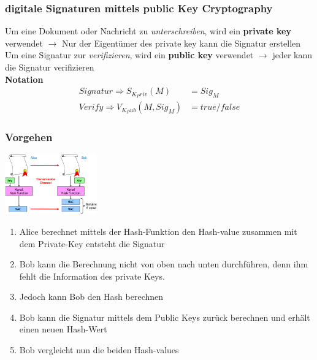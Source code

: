 \documentclass{report}
\newenvironment{Figure}
	{\par\medskip\noindent\minipage{\linewidth}}
	{\endminipage\par\medskip}
\theoremstyle{definition}
\theoremstyle{example}
\begin{document}
		\subsubsection{digitale Signaturen mittels public Key Cryptography}
Um eine Dokument oder Nachricht zu \textit{unterschreiben}, wird ein \textbf{private key} verwendet $\rightarrow$ Nur der Eigentümer des private key kann die Signatur erstellen\\
Um eine Signatur zur \textit{verifizieren}, wird ein \textbf{public key} verwendet $\rightarrow$ jeder kann die Signatur verifizieren\\
\textbf{Notation}
\begin{equation}
\begin{split}
	Signatur \Rightarrow S_{K_Priv} (M) &= Sig_M\\
	Verify \Rightarrow V_{K_Pub} (M, Sig_M) &= true / false
\end{split}
\end{equation}

	\subsubsection{Vorgehen}
\begin{Figure}
\centering
\includegraphics[width=150px]{img/MessageAuthenticationCodes.png}
	\label{fig:Message Integrity / Authenticity}
\end{Figure}
\begin{enumerate}
	\item Alice berechnet mittels der Hash-Funktion den Hash-value zusammen mit dem Private-Key entsteht die Signatur
	\item Bob kann die Berechnung nicht von oben nach unten durchführen, denn ihm fehlt die Information des private Keys. 
	\item Jedoch kann Bob den Hash berechnen
	\item Bob kann die Signatur mittels dem Public Keys zurück berechnen und erhält einen neuen Hash-Wert
	\item Bob vergleicht nun die beiden Hash-values
\end{enumerate}
	
\end{document}
